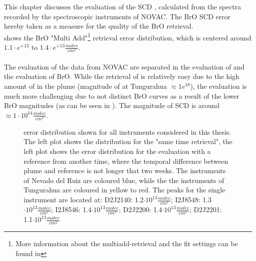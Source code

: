 This chapter discusses the evaluation of the  SCD , calculated from the spectra recorded by the spectroscopic instruments of NOVAC. The BrO SCD error hereby taken as a measure for the quality of the BrO retrieval.\\
 shows the BrO "Multi Add"\footnote{More information about the multiadd-retrieval and the fit settings can be found in } retrieval error distribution, which is centered around $1.1\cdot e^{+13}$ to $1.4\cdot e^{+13}\frac{molec}{cm^2}$. \\
\\
The evaluation of the data from NOVAC are separated in the evaluation of  and the evaluation of BrO. While the retrieval of  is relatively easy due to the high amount of  in the plume (magnitude of  at Tungurahua $\approx 1e^{18}$), the  evaluation is much more challenging due to not distinct BrO curves as a result of the lower BrO magnitudes (as can be seen in ). The magnitude of  SCD is around $\approx 1\cdot 10^{14}\frac{molec}{cm^2}$. \\
%
\begin{figure}
	\caption{ error distribution shown for all instruments considered in this thesis. The left plot shows the  distribution for the "same time retrieval", the left plot shows the  error distribution for the evaluation with a reference from another time, where the temporal difference between plume and reference is not longer that two weeks. The instruments of Nevado del Ruiz are coloured blue, while the the instruments of Tungurahua are coloured in yellow to red.
		The peaks for the single instrument are located at: D2J2140: 1.2$\cdot 10^{13}\frac{molec}{cm^2}$; I2J8548: 1.3$\cdot 10^{13}\frac{molec}{cm^2}$;
		I2J8546: 1.4$\cdot 10^{13}\frac{molec}{cm^2}$;
		D2J2200: 1.4$\cdot 10^{13}\frac{molec}{cm^2}$;
		D2J2201: 1.1$\cdot 10^{13}\frac{molec}{cm^2}$}
	\label{fig:allbroerrordistribution}
\end{figure}
